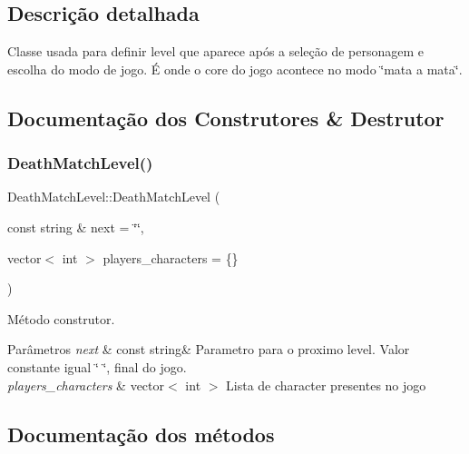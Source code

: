 \subsection{Descrição detalhada}
Classe usada para definir level que aparece após a seleção de personagem e escolha do modo de jogo. É onde o core do jogo acontece no modo \char`\"{}mata a mata\char`\"{}. 

\subsection{Documentação dos Construtores \& Destrutor}
\mbox{\label{classDeathMatchLevel_a3a0a88f354b3de9651f1a7d0dc0915ce}} 
\subsubsection{\texorpdfstring{Death\+Match\+Level()}{DeathMatchLevel()}}
{\footnotesize\ttfamily Death\+Match\+Level\+::\+Death\+Match\+Level (\begin{DoxyParamCaption}\item[{const string \&}]{next = {\ttfamily \char`\"{}\char`\"{}},  }\item[{vector$<$ int $>$}]{players\+\_\+characters = {\ttfamily \{\}} }\end{DoxyParamCaption})}



Método construtor. 


\begin{DoxyParams}{Parâmetros}
{\em next} & const string\& Parametro para o proximo level. Valor constante igual \char`\"{} \char`\"{}, final do jogo. \\
\hline
{\em players\+\_\+characters} & vector$<$ int $>$ Lista de character presentes no jogo \\
\hline
\end{DoxyParams}


\subsection{Documentação dos métodos}
\mbox{\label{classDeathMatchLevel_a7114eedff2c865c69efcad08ce97c252}} 
